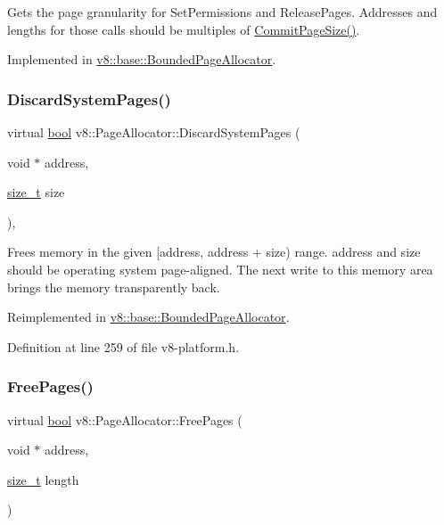 Gets the page granularity for Set\+Permissions and Release\+Pages. Addresses and lengths for those calls should be multiples of \mbox{\hyperlink{classv8_1_1PageAllocator_ad817d87004151e3824997415f2dc57e9}{Commit\+Page\+Size()}}. 

Implemented in \mbox{\hyperlink{classv8_1_1base_1_1BoundedPageAllocator_a68462e5a1751aa3a8fb0068deca16c5f}{v8\+::base\+::\+Bounded\+Page\+Allocator}}.

\mbox{\label{classv8_1_1PageAllocator_ad0de847c922e25f63d82494d997f441d}} 
\subsubsection{\texorpdfstring{Discard\+System\+Pages()}{DiscardSystemPages()}}
{\footnotesize\ttfamily virtual \mbox{\hyperlink{classbool}{bool}} v8\+::\+Page\+Allocator\+::\+Discard\+System\+Pages (\begin{DoxyParamCaption}\item[{void $\ast$}]{address,  }\item[{\mbox{\hyperlink{classsize__t}{size\+\_\+t}}}]{size }\end{DoxyParamCaption})\hspace{0.3cm}{\ttfamily [inline]}, {\ttfamily [virtual]}}

Frees memory in the given \mbox{[}address, address + size) range. address and size should be operating system page-\/aligned. The next write to this memory area brings the memory transparently back. 

Reimplemented in \mbox{\hyperlink{classv8_1_1base_1_1BoundedPageAllocator_a31ae3d1e2696d53c6ac47e2f525bc1e7}{v8\+::base\+::\+Bounded\+Page\+Allocator}}.



Definition at line 259 of file v8-\/platform.\+h.

\mbox{\label{classv8_1_1PageAllocator_abc2e3fdc768aba7d35ce0cf44f14586c}} 
\subsubsection{\texorpdfstring{Free\+Pages()}{FreePages()}}
{\footnotesize\ttfamily virtual \mbox{\hyperlink{classbool}{bool}} v8\+::\+Page\+Allocator\+::\+Free\+Pages (\begin{DoxyParamCaption}\item[{void $\ast$}]{address,  }\item[{\mbox{\hyperlink{classsize__t}{size\+\_\+t}}}]{length }\end{DoxyParamCaption})\hspace{0.3cm}{\ttfamily [pure virtual]}}

